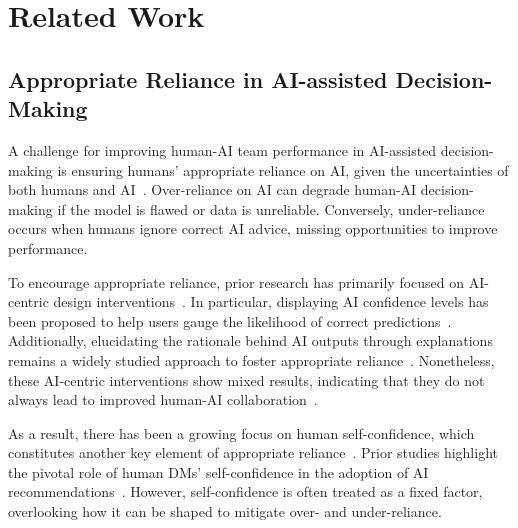 \section{Related Work}
\subsection{Appropriate Reliance in AI-assisted Decision-Making}
A challenge for improving human-AI team performance in AI-assisted decision-making is ensuring humans’ appropriate reliance on AI, given the uncertainties of both humans and AI~\cite{schemmer2023appropriate,does_the,buccinca2021trust,towards_science}.
Over-reliance on AI can degrade human-AI decision-making if the model is flawed or data is unreliable. Conversely, under-reliance occurs when humans ignore correct AI advice, missing opportunities to improve performance.

To encourage appropriate reliance, prior research has primarily focused on AI-centric design interventions~\cite{effect_of_confidence}. In particular, displaying AI confidence levels has been proposed to help users gauge the likelihood of correct predictions~\cite{effect_of_confidence,vodrahalli2022uncalibrated,who_should}. Additionally, elucidating the rationale behind AI outputs through explanations remains a widely studied approach to foster appropriate reliance~\cite{effect_of_confidence,does_the,Are_explanations,li2024utilizing}.
Nonetheless, these AI-centric interventions show mixed results, indicating that they do not always lead to improved human-AI collaboration~\cite{effect_of_confidence,who_should,visual_uncertainty}.

As a result, there has been a growing focus on human self-confidence, which constitutes another key element of appropriate reliance~\cite{chong2022human,vodrahalli2022humans,are_you_really,mahmood2024designing}. Prior studies highlight the pivotal role of human DMs' self-confidence in the adoption of AI recommendations~\cite{chong2022human}.
However, self-confidence is often treated as a fixed factor, overlooking how it can be shaped to mitigate over- and under-reliance. 


